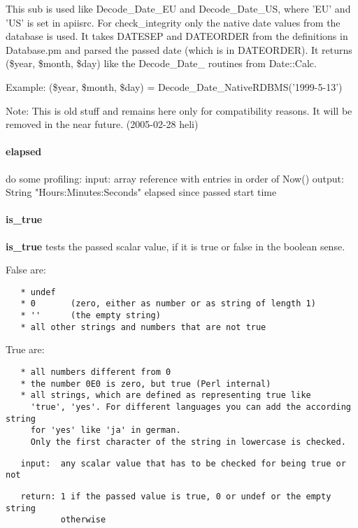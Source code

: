This sub is used like Decode\_Date\_EU and Decode\_Date\_US, where 'EU' and 'US'
is set in apiisrc. For check\_integrity only the native date values from the
database is used. It takes DATESEP and DATEORDER from the definitions in
Database.pm and parsed the passed date (which is in DATEORDER). It returns
(\$year, \$month, \$day) like the Decode\_Date\_ routines from Date::Calc.



Example: (\$year, \$month, \$day) = Decode\_Date\_NativeRDBMS('1999-5-13')



Note: This is old stuff and remains here only for compatibility reasons. It
will be removed in the near future. (2005-02-28 heli)

\paragraph*{elapsed\label{Apiis::Misc_--_Provides_some_usefull_subroutines_mainly_for_compatibility_reasons_elapsed}}


do some profiling:
   input:  array reference with entries in order of Now()
   output: String "Hours:Minutes:Seconds" elapsed since passed start time

\paragraph*{is\_true\label{Apiis::Misc_--_Provides_some_usefull_subroutines_mainly_for_compatibility_reasons_is_true}}


\textbf{is\_true} tests the passed scalar value, if it is true or false in the
boolean sense.



False are:

\begin{verbatim}
   * undef
   * 0       (zero, either as number or as string of length 1)
   * ''      (the empty string)
   * all other strings and numbers that are not true
\end{verbatim}


True are:

\begin{verbatim}
   * all numbers different from 0
   * the number 0E0 is zero, but true (Perl internal)
   * all strings, which are defined as representing true like
     'true', 'yes'. For different languages you can add the according string
     for 'yes' like 'ja' in german.
     Only the first character of the string in lowercase is checked.
\end{verbatim}
\begin{verbatim}
   input:  any scalar value that has to be checked for being true or not
\end{verbatim}
\begin{verbatim}
   return: 1 if the passed value is true, 0 or undef or the empty string
           otherwise
\end{verbatim}
